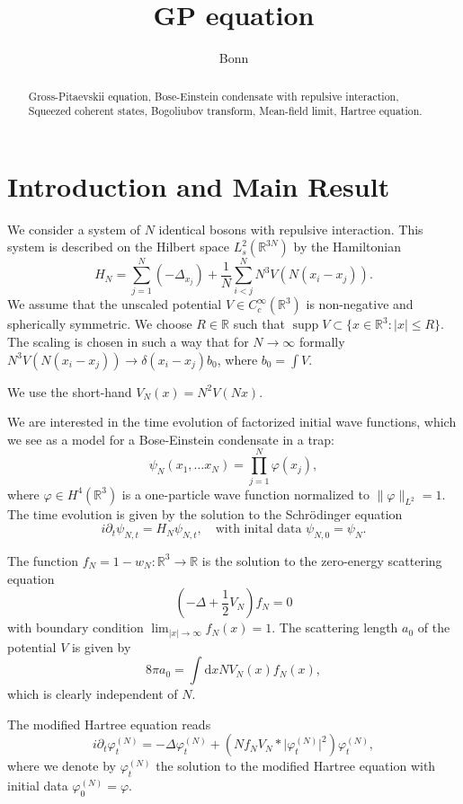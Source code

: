 \documentclass[11pt,a4paper,draft,DIV11]{scrartcl}	%
\author{Bonn}
\title{GP equation}
\newcommand{\di}{\textrm{d}}		%
\newcommand{\Rbb}{\mathbb{R}}		%
\newcommand{\norm}[1]{\lVert#1\rVert}	%
\newcommand{\ph}{\varphi_t^{(N)}}	%
\newcommand{\be}[1]{\begin{equation}\label{eq:#1}}	%
\newcommand{\ee}{\end{equation}}
\newcommand{\bd}{\begin{displaymath}}			%
\newcommand{\ed}{\end{displaymath}}
\begin{document}
\maketitle

\begin{abstract}
 Gross-Pitaevskii equation, Bose-Einstein condensate with repulsive interaction, Squeezed coherent states, Bogoliubov transform, Mean-field limit, Hartree equation.
\end{abstract}

\section{Introduction and Main Result}
We consider a system of $N$ identical bosons with repulsive interaction. This system is described on the Hilbert space $L^2_s(\Rbb^{3N})$ by the Hamiltonian
\bd
H_N = \sum_{j=1}^N (-\Delta_{x_j}) + \frac{1}{N}\sum_{i<j}^N N^3 V(N(x_i-x_j)).
\ed
We assume that the unscaled potential $V \in C^\infty_c(\Rbb^3)$ is non-negative and spherically symmetric. We choose $R \in \Rbb$ such that $\operatorname{supp} V \subset \{x \in \Rbb^3 : \lvert x\rvert \leq R \}$. The scaling is chosen in such a way that for $N \to \infty$ formally $N^3 V(N(x_i-x_j)) \to \delta(x_i-x_j) b_0$, where $b_0 = \int V$.

We use the short-hand $V_N(x) = N^2 V(Nx)$.

We are interested in the time evolution of factorized initial wave functions, which we see as a model for a Bose-Einstein condensate in a trap:
\bd
\psi_N(x_1,\ldots x_N) = \prod_{j=1}^N \varphi(x_j),
\ed
where $\varphi \in H^4(\Rbb^3)$ is a one-particle wave function normalized to $\norm{\varphi}_{L^2} = 1$. The time evolution is given by the solution to the Schr\"odinger equation 
\bd
i \partial_t \psi_{N,t} = H_N \psi_{N,t},\quad \mbox{with inital data } \psi_{N,0} = \psi_N.
\ed

The function $f_N = 1 - w_N: \Rbb^3 \to \Rbb$ is the solution to the zero-energy scattering equation
\bd
\left(-\Delta + \frac{1}{2}V_N \right) f_N = 0
\ed
with boundary condition $\lim_{\lvert x\rvert \to \infty} f_N(x) = 1$. The scattering length $a_0$ of the potential $V$ is given by
\bd
8\pi a_0 = \int \di x NV_N(x)f_N(x),
\ed
which is clearly independent of $N$.

The modified Hartree equation reads
\be{modHartreeEqu}
i \partial_t \ph = -\Delta \ph + \left(N f_N V_N \ast \lvert \ph\rvert^2 \right) \ph,
\ee
where we denote by $\ph$ the solution to the modified Hartree equation with initial data $\varphi^{(N)}_0 = \varphi$.
\end{document}
